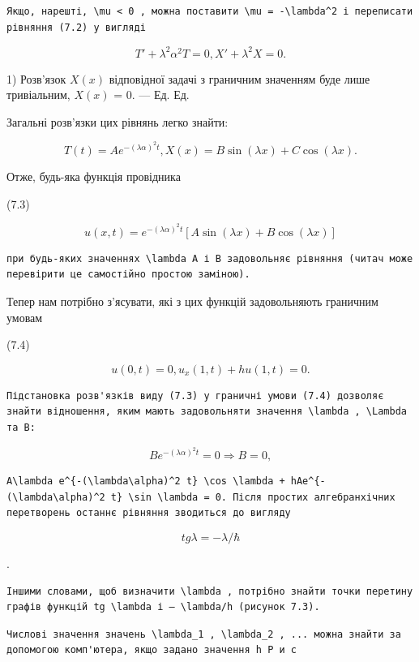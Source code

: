 \documentclass[
  ukrainian,
]{article}
\begin{document}
\begin{verbatim}
Якщо, нарешті, \mu < 0 , можна поставити \mu = -\lambda^2 і переписати рівняння (7.2) у вигляді
\end{verbatim}

\[
T' + \lambda^2 \alpha^2 T = 0,
X' + \lambda^2 X = 0.
\]

1) Розв'язок \(X(x)\) відповідної задачі з граничним значенням буде лише
тривіальним, \(X(x)\) = 0. --- Ед. Ед.

Загальні розв'язки цих рівнянь легко знайти:

\[
T(t) = Ae^{-(\lambda \alpha)^2 t},
X(x) = B\sin(\lambda x) + C\cos(\lambda x).
\]

Отже, будь-яка функція провідника

(7.3)

\[
u(x, t) = e^{-(\lambda \alpha)^2 t} [A \sin(\lambda x) + B \cos(\lambda x)]
\]

\begin{verbatim}
при будь-яких значеннях \lambda A і B задовольняє рівняння (читач може перевірити це самостійно простою заміною).
\end{verbatim}

Тепер нам потрібно з'ясувати, які з цих функцій задовольняють граничним
умовам

(7.4)

\[
u(0, t) = 0, u_x(1, t) + hu(1, t) = 0.
\]

\begin{verbatim}
Підстановка розв'язків виду (7.3) у граничні умови (7.4) дозволяє знайти відношення, яким мають задовольняти значення \lambda , \Lambda та B:
\end{verbatim}

\[
Be^{-(\lambda\alpha)^2 t} = 0 \Rightarrow B = 0,
\]

\begin{verbatim}
A\lambda e^{-(\lambda\alpha)^2 t} \cos \lambda + hAe^{-(\lambda\alpha)^2 t} \sin \lambda = 0. Після простих алгебранхічних перетворень останнє рівняння зводиться до вигляду
\end{verbatim}

\[
tg \lambda = -\lambda/\hbar
\]

.

\begin{verbatim}
Іншими словами, щоб визначити \lambda , потрібно знайти точки перетину графів функцій tg \lambda і — \lambda/h (рисунок 7.3).
\end{verbatim}

\begin{verbatim}
Числові значення значень \lambda_1 , \lambda_2 , ... можна знайти за допомогою комп'ютера, якщо задано значення h Р и с
\end{verbatim}
\end{document}
